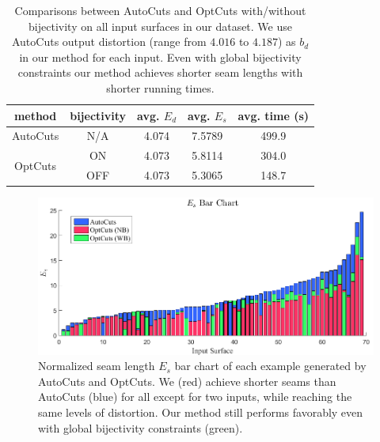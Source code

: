 \begin{table}[t]
\centering
\caption{Comparisons between AutoCuts and OptCuts with/without bijectivity on all input surfaces in our dataset. We use AutoCuts output distortion (range from $4.016$ to $4.187$) as $b_d$ in our method for each input. Even with global bijectivity constraints our method achieves shorter seam lengths with shorter running times.}
\label{tb:comp_AutoCuts}
\begin{tabular}{|c|c|c|c|c|}
\hline
method                   & bijectivity & avg. $E_{d}$ & avg. $E_{s}$ & avg. time (s) \\ \hline
AutoCuts                 & N/A         & 4.074        & 7.5789       & 499.9         \\ \hline
\multirow{2}{*}{OptCuts} & ON          & 4.073        & 5.8114       & 304.0         \\
                         & OFF         & 4.073        & 5.3065       & 148.7         \\ \hline
\end{tabular}
\end{table}

\begin{figure}[t]
\centering
\includegraphics[width=\linewidth]{fig/ESLBar_compAutoCuts.png}
\caption{Normalized seam length $E_{s}$ bar chart of each example generated by AutoCuts and OptCuts. We (red) achieve shorter seams than AutoCuts (blue) for all except for two inputs, while reaching the same levels of distortion. Our method still performs favorably even with global bijectivity constraints (green).}
\label{fig:ESLBar_compAutoCuts}
\end{figure}


